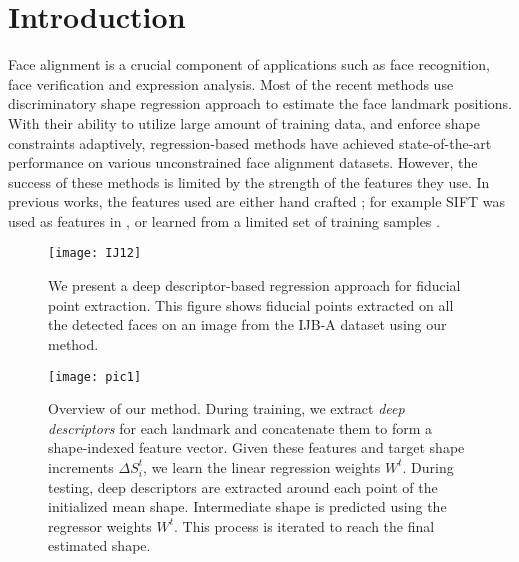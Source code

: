 \documentclass[10pt,twocolumn,letterpaper]{article}
\begin{document}
\section{Introduction}

Face alignment is a crucial component of applications such as face recognition, face verification and expression analysis. Most of the recent methods use discriminatory shape regression approach to estimate the face landmark positions. With their ability to utilize large amount of training data, and enforce shape constraints adaptively, regression-based methods have achieved state-of-the-art performance on various unconstrained face alignment datasets. However, the success of these methods is limited by the strength of the features they use. In previous works, the features used are either hand crafted ; for example SIFT was used as features in \cite{XiongD13}, or learned from a limited set of training samples \cite{DBLP:journals/ijcv/CaoWWS14,DBLP:conf/cvpr/RenCW014}.

\begin{figure}[t]
\label{overview_fig}
\begin{center}
\texttt{[image: IJ12]}
\end{center}
\vskip-10pt
\caption{We present a deep descriptor-based regression approach for fiducial point extraction.  This figure shows fiducial points extracted on all the detected faces on an image from the IJB-A\cite{F._2015_CVPR} dataset using our method.}
\end{figure}


\begin{figure*}[t]
\begin{center}
\texttt{[image: pic1]}
\end{center}
\vskip-17pt
\caption{Overview of our method. During training, we extract \textit{deep descriptors} for each landmark  and concatenate them to form a shape-indexed feature vector. Given these features and target shape increments $\Delta S_{i}^t$, we learn the linear regression weights \textit{$W^t$}. During testing, deep descriptors are extracted around each point of the initialized mean shape. Intermediate shape is predicted using the regressor weights \textit{$W^t$}. This process is iterated to reach the final estimated shape.}\label{overview}
\end{figure*}
\end{document}
